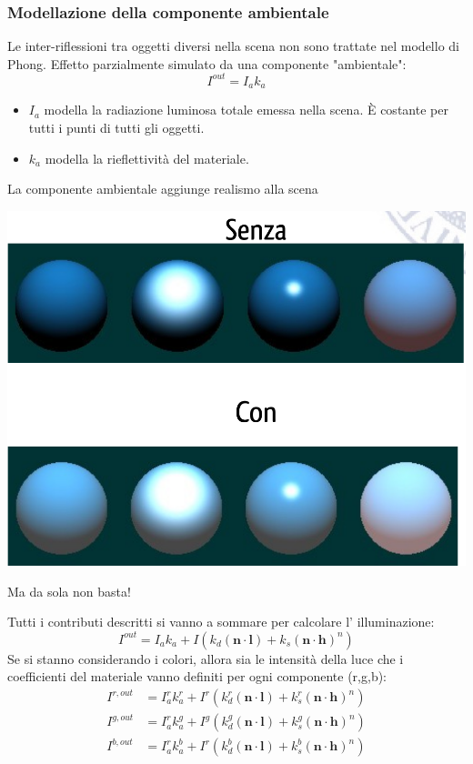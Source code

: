 \documentclass[a4paper, 10pt]{article}
\renewcommand{\vec}{\bm}
\begin{document}
			
		\subsubsection{Modellazione della componente ambientale}
			Le inter-riflessioni tra oggetti diversi nella scena non sono
			trattate nel modello di Phong. 
			Effetto parzialmente simulato da una componente "ambientale":
			\[
				I^{out} = I_a k_a
			\]
			\begin{itemize}
				\item $ I_a $ modella la radiazione luminosa totale emessa nella scena. È costante per tutti i punti di tutti gli oggetti.
				\item $ k_a $ modella la rieflettività del materiale.
			\end{itemize}
			La componente ambientale aggiunge realismo alla scena
			
			\begin{center}
				\includegraphics[scale=0.2]{ambientale}
			\end{center}
			Ma da sola non basta!
			
			\bigskip
			
			Tutti i contributi descritti si vanno a sommare per calcolare l’
			illuminazione:
			\[
				I^{out} = I_a k_a + I(k_d(\vec{n}\cdot\vec{l}) + k_s(\vec{n}\cdot\vec{h})^n)
			\]
			Se si stanno considerando i colori, allora sia le intensità della
			luce che i coefficienti del materiale vanno definiti per ogni
			componente (r,g,b):
			\begin{align*}
				I^{r,out} &= I_a^r k_a^r + I^r(k_d^r(\vec{n}\cdot\vec{l}) + k_s^r(\vec{n}\cdot\vec{h})^n) \\
				I^{g,out} &= I_a^r k_a^g + I^g(k_d^g(\vec{n}\cdot\vec{l}) + k_s^g(\vec{n}\cdot\vec{h})^n) \\
				I^{b,out} &= I_a^r k_a^b + I^r(k_d^b(\vec{n}\cdot\vec{l}) + k_s^b(\vec{n}\cdot\vec{h})^n)
			\end{align*}
			
\end{document}
